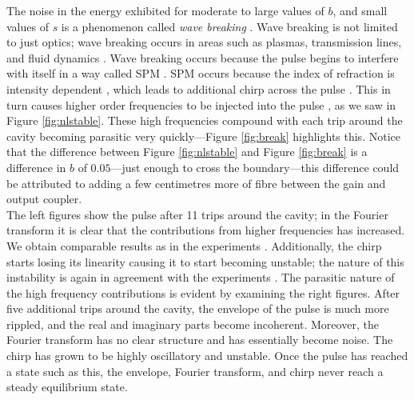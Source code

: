 \documentclass[10pt,twocolumn,a4paper]{article}
\begin{document}
The noise in the energy exhibited for moderate to large values of $b$, and small values of $s$ is a phenomenon called \emph{wave breaking} \cite{agrawal2013, anderson, finot, rothenberg, tomlinson}. Wave breaking is not limited to just optics; wave breaking occurs in areas such as plasmas, transmission lines, and fluid dynamics \cite{rothenberg}. Wave breaking occurs because the pulse begins to interfere with itself in a way called SPM \cite{agrawal2002, agrawal2013, becker}. SPM occurs because the index of refraction is intensity dependent \cite{agrawal2002, becker, rothenberg, silfvast}, which leads to additional chirp across the pulse \cite{agrawal2013, anderson, rothenberg, silfvast}. This in turn causes higher order frequencies to be injected into the pulse \cite{agrawal2013, anderson}, as we saw in Figure \ref{fig:nlstable}. These high frequencies compound with each trip around the cavity becoming parasitic very quickly---Figure \ref{fig:break} highlights this. Notice that the difference between Figure \ref{fig:nlstable} and Figure \ref{fig:break} is a difference in $b$ of $0.05$---just enough to cross the boundary---this difference could be attributed to adding a few centimetres more of fibre between the gain and output coupler. \\

The left figures show the pulse after 11 trips around the cavity; in the Fourier transform it is clear that the contributions from higher frequencies has increased. We obtain comparable results as in the experiments \cite{anderson, rothenberg}. Additionally, the chirp starts losing its linearity causing it to start becoming unstable; the nature of this instability is again in agreement with the experiments \cite{anderson, rothenberg}. The parasitic nature of the high frequency contributions is evident by examining the right figures. After five additional trips around the cavity, the envelope of the pulse is much more rippled, and the real and imaginary parts become incoherent. Moreover, the Fourier transform has no clear structure and has essentially become noise. The chirp has grown to be highly oscillatory and unstable. Once the pulse has reached a state such as this, the envelope, Fourier transform, and chirp never reach a steady equilibrium state.
\end{document}
